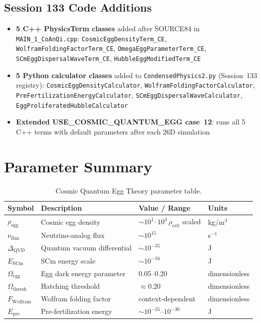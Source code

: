 \documentclass[12pt]{article}
\begin{document}
\subsection{Session 133 Code Additions}

\begin{itemize}
    \item \textbf{5 C++ PhysicsTerm classes} added after SOURCE84 in
          \texttt{MAIN\_1\_CoAnQi.cpp}:
          \texttt{CosmicEggDensityTerm\_CE},
          \texttt{WolframFoldingFactorTerm\_CE},
          \texttt{OmegaEggParameterTerm\_CE},
          \texttt{SCmEggDispersalWaveTerm\_CE},
          \texttt{HubbleEggModifiedTerm\_CE}
    \item \textbf{5 Python calculator classes} added to
          \texttt{CondensedPhysics2.py} (Session~133 registry):
          \texttt{CosmicEggDensityCalculator},
          \texttt{WolframFoldingFactorCalculator},
          \texttt{PreFertilizationEnergyCalculator},
          \texttt{SCmEggDispersalWaveCalculator},
          \texttt{EggProliferatedHubbleCalculator}
    \item \textbf{Extended USE\_COSMIC\_QUANTUM\_EGG case~12}: runs all 5
          C++ terms with default parameters after each 26D simulation
\end{itemize}

\section{Parameter Summary}

\begin{table}[h]
\centering
\begin{tabular}{llll}
\toprule
Symbol & Description & Value / Range & Units \\
\midrule
$\rho_\text{egg}$ & Cosmic egg density & $\sim10^1$--$10^3\,\rho_\text{crit}$ scaled & kg/m$^3$ \\
$\nu_\text{flux}$ & Neutrino-analog flux & $\sim10^{15}$ & s$^{-1}$ \\
$\Delta_\text{QVD}$ & Quantum vacuum differential & $\sim10^{-35}$ & J \\
$E_\text{SCm}$ & SCm energy scale & $\sim10^{-34}$ & J \\
$\Omega_\text{egg}$ & Egg dark energy parameter & 0.05--0.20 & dimensionless \\
$\Omega_\text{thresh}$ & Hatching threshold & $\approx0.20$ & dimensionless \\
$F_\text{Wolfram}$ & Wolfram folding factor & context-dependent & dimensionless \\
$E_\text{pre}$ & Pre-fertilization energy & $\sim10^{-35}$--$10^{-30}$ & J \\
\bottomrule
\end{tabular}
\caption{Cosmic Quantum Egg Theory parameter table.}
\end{table}
\end{document}
